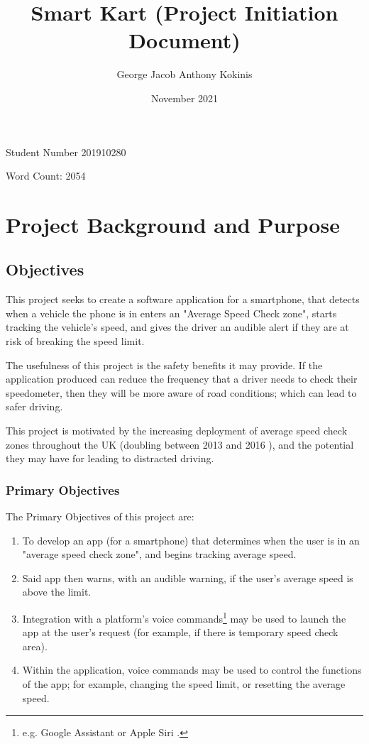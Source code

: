 \documentclass[11pt, a4paper, notitlepage]{report}
\title{Smart Kart (Project Initiation Document)}
\date{November 2021}
\author{George Jacob Anthony Kokinis}
\newcounter{objectivesCounter}
\begin{document}
\maketitle
\begin{center}
    Student Number 201910280
    
    Word Count: 2054 %
\end{center}
\newpage

\tableofcontents

\chapter{Project Background and Purpose}
\section{Objectives}
This project seeks to create a software application for a smartphone, that 
detects when a vehicle the phone is in enters an "Average Speed Check zone", 
starts tracking the vehicle's speed, and gives the driver an audible alert if 
they are at risk of breaking the speed limit.

The usefulness of this project is the safety benefits it may provide. If the 
application produced can reduce the frequency that a driver needs to check 
their speedometer, then they will be more aware of road conditions; which can 
lead to safer driving.

This project is motivated by the increasing deployment of average speed check 
zones throughout the UK (doubling between 2013 and 2016 
\citep{BBCSpeedCameraDoubled}), and the potential they may have for leading to 
distracted driving.

\subsection{Primary Objectives}\label{subsec:PrimaryObjectives}
The Primary Objectives of this project are:
\begin{enumerate}
    \item To develop an app (for a smartphone) that determines when the user is 
    in an "average speed check zone", and begins tracking average speed.
    \item Said app then warns, with an audible warning, if the user's average 
    speed is above the limit.
    \item Integration with a platform's voice commands\footnote{e.g. Google Assistant \citep{GoogleAssistant} or Apple Siri \citep{AppleSiri}.} may be used to launch the app at the user's request (for example, if there is temporary speed check area).
    \item Within the application, voice commands may be used to control the functions of the app; for example, changing the speed limit, or resetting the average speed.
    \setcounter{objectivesCounter}{\value{enumi}}
\end{enumerate}
\end{document}
